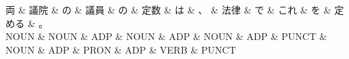 \documentclass[tikz,border=5pt]{standalone}
\begin{document}
\normalsize
\begin{dependency}[edge unit distance=12.0pt]
    \begin{deptext}[column sep=1em]
        両 \& 議院 \& の \& 議員 \& の \& 定数 \& は \& 、 \& 法律 \& で \& これ \& を \& 定める \& 。\\
        NOUN \& NOUN \& ADP \& NOUN \& ADP \& NOUN \& ADP \& PUNCT \& NOUN \& ADP \& PRON \& ADP \& VERB \& PUNCT\\
    \end{deptext}
\end{dependency}
\end{document}
